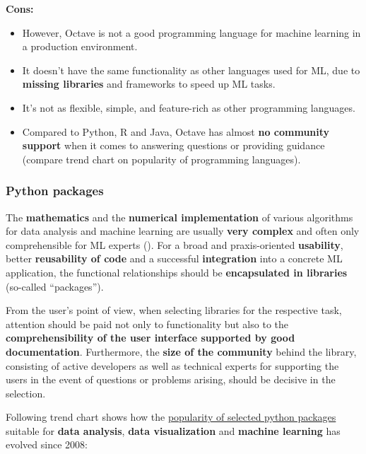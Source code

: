 \documentclass [oneside,10pt,a4paper,ngerman,BCOR10mm,headsepline,parindent,final]{scrartcl}
\providecommand{\tightlist}{%
      \setlength{\itemsep}{0pt}\setlength{\parskip}{0pt}}
\begin{document}
\textbf{Cons:}

\begin{itemize}
\tightlist
\item
  However, Octave is not a good programming language for machine
  learning in a production environment.
\item
  It doesn't have the same functionality as other languages used for ML,
  due to \textbf{missing libraries} and frameworks to speed up ML tasks.
\item
  It's not as flexible, simple, and feature-rich as other programming
  languages.
\item
  Compared to Python, R and Java, Octave has almost \textbf{no community
  support} when it comes to answering questions or providing guidance
  (compare trend chart on popularity of programming languages).
\end{itemize}

    \hypertarget{python-packages}{%
\subsubsection{Python packages}\label{python-packages}}

The \textbf{mathematics} and the \textbf{numerical implementation} of
various algorithms for data analysis and machine learning are usually
\textbf{very complex} and often only comprehensible for ML experts
(\cite{ML_bestLanguage_2021}). For a broad and praxis-oriented
\textbf{usability}, better \textbf{reusability of code} and a successful
\textbf{integration} into a concrete ML application, the functional
relationships should be \textbf{encapsulated in libraries} (so-called
``packages'').

From the user's point of view, when selecting libraries for the
respective task, attention should be paid not only to functionality but
also to the \textbf{comprehensibility of the user interface supported by
good documentation}. Furthermore, the \textbf{size of the community}
behind the library, consisting of active developers as well as technical
experts for supporting the users in the event of questions or problems
arising, should be decisive in the selection.

Following trend chart shows how the
\href{https://insights.stackoverflow.com/trends?tags=pandas\%2Ctensorflow\%2Cnumpy\%2Ckeras\%2Cscikit-learn\%2Cmatplotlib}{popularity
of selected python packages} suitable for \textbf{data analysis},
\textbf{data visualization} and \textbf{machine learning} has evolved
since 2008:
\end{document}
